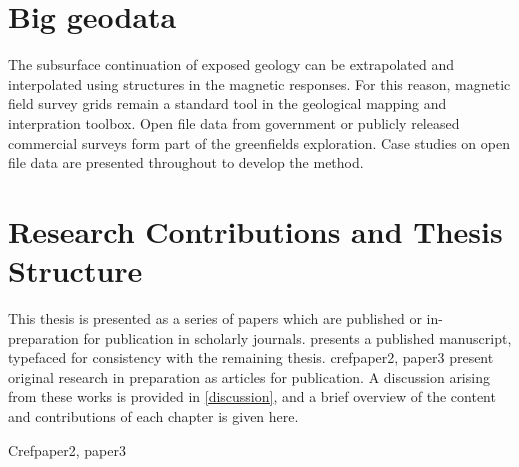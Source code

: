\documentclass[manuscript.tex]{subfiles}
\begin{document}
\section{Big geodata} %
The subsurface continuation of exposed geology can be extrapolated and interpolated using structures in the magnetic responses.
For this reason, magnetic field survey grids remain a standard tool in the geological mapping and interpration toolbox. 
Open file data from government or publicly released commercial surveys form part of the greenfields exploration.
Case studies on open file data are presented throughout to develop the method.


\section{Research Contributions and Thesis Structure}
This thesis is presented as a series of papers which are published or in-preparation for publication in scholarly journals.
 presents a published manuscript, typefaced for consistency with the remaining thesis.
cref{paper2, paper3} present original research in preparation as articles for publication.
A discussion arising from these works is provided in \cref{discussion}, and a brief overview of the content and contributions of each chapter is given here.

Cref{paper2, paper3} 
\end{document}
